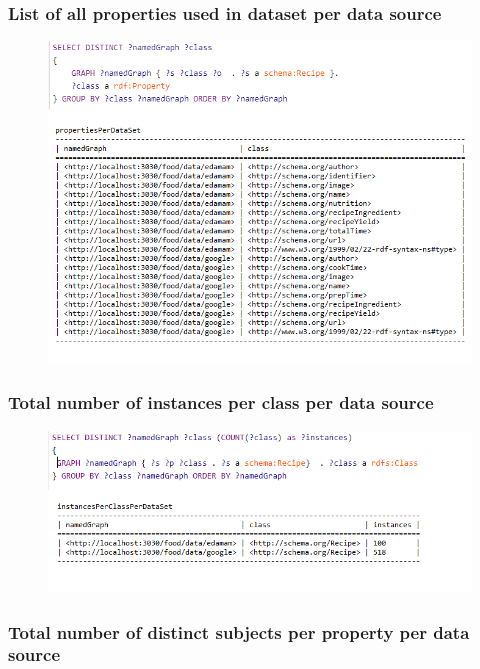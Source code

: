 \documentclass{article}
\begin{document}
\subsubsection{List of all properties used in dataset per data source}

\begin{figure}[H]
  \centering
  \includegraphics[width=12cm]{pictures/res6_prop_per_datasource.png}
  \label{fig:qures6}
\end{figure}

\subsubsection{Total number of instances per class per data source}

\begin{figure}[H]
  \centering
  \includegraphics[width=12cm]{pictures/res7_inst_per_class_per_datasource.png}
  \label{fig:qures7}
\end{figure}

\subsubsection{Total number of distinct subjects per property per data source}
\end{document}

